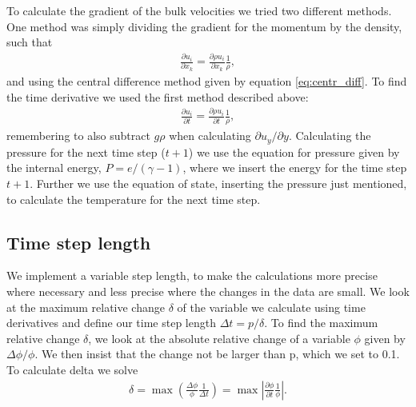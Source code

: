\documentclass[a4paper,10pt]{article}
\begin{document}
To calculate the gradient of the bulk velocities we tried two different methods. One method was simply dividing the gradient for the momentum by the density, such that
%
\begin{align*}
\frac{\partial u_i}{\partial x_k} = \frac{\partial \rho u_i}{\partial x_k}\frac{1}{\rho},
\end{align*}
%
and using the central difference method given by equation \eqref{eq:centr_diff}. To find the time derivative we used the first method described above:
%
\begin{align}
\frac{\partial u_i}{\partial t} = \frac{\partial \rho u_i}{\partial t}\frac{1}{\rho},
\end{align} 
%
remembering to also subtract $g\rho$ when calculating $\partial u_y/\partial y$. Calculating the pressure for the next time step ($t+1$) we use the equation for pressure given by the internal energy, $P = e/(\gamma - 1)$, where we insert the energy for the time step $t+1$. Further we use the equation of state, inserting the pressure just mentioned, to calculate the temperature for the next time step.

\subsection{Time step length}
We implement a variable step length, to make the calculations more precise where necessary and less precise where the changes in the data are small. We look at the maximum relative change $\delta$ of the variable we calculate using time derivatives and define our time step length $\Delta t = p/\delta$. To find the maximum relative change $\delta$, we look at the absolute relative change of a variable $\phi$ given by $\Delta \phi/\phi$. We then insist that the change not be larger than p, which we set to 0.1. To calculate delta we solve
%
\begin{align*}
\delta = \max\left(\frac{\Delta \phi}{\phi}\frac{1}{\Delta t}\right) = \max\left|\frac{\partial \phi}{\partial t} \frac{1}{\phi}\right|.
\end{align*}
\end{document}
